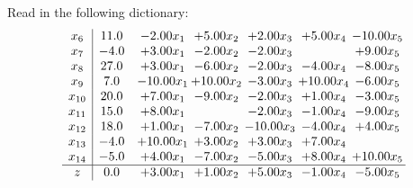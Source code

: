 \documentclass[9pt]{article}
\begin{document}
Read in the following dictionary:
\[\begin{array}{c| c c@{\hskip 2pt} c@{\hskip 2pt} c@{\hskip 2pt} c@{\hskip 2pt} c@{\hskip 2pt} }
 x_{6}   &  11.0 & -2.00 x_{1} & +  5.00 x_{2} & +  2.00 x_{3} & +  5.00 x_{4} & -10.00 x_{5}\\
 x_{7}   &  -4.0 & +  3.00 x_{1} & -2.00 x_{2} & -2.00 x_{3} &   & +  9.00 x_{5}\\
 x_{8}   &  27.0 & +  3.00 x_{1} & -6.00 x_{2} & -2.00 x_{3} & -4.00 x_{4} & -8.00 x_{5}\\
 x_{9}   &  7.0 & -10.00 x_{1} & + 10.00 x_{2} & -3.00 x_{3} & + 10.00 x_{4} & -6.00 x_{5}\\
 x_{10}   &  20.0 & +  7.00 x_{1} & -9.00 x_{2} & -2.00 x_{3} & +  1.00 x_{4} & -3.00 x_{5}\\
 x_{11}   &  15.0 & +  8.00 x_{1} &   & -2.00 x_{3} & -1.00 x_{4} & -9.00 x_{5}\\
 x_{12}   &  18.0 & +  1.00 x_{1} & -7.00 x_{2} & -10.00 x_{3} & -4.00 x_{4} & +  4.00 x_{5}\\
 x_{13}   &  -4.0 & + 10.00 x_{1} & +  3.00 x_{2} & +  3.00 x_{3} & +  7.00 x_{4} &   \\
 x_{14}   &  -5.0 & +  4.00 x_{1} & -7.00 x_{2} & -5.00 x_{3} & +  8.00 x_{4} & + 10.00 x_{5}\\
\hline
z    &  0.0 & +  3.00 x_{1} & +  1.00 x_{2} & +  5.00 x_{3} & -1.00 x_{4} & -5.00 x_{5}\\
\end{array}\]
\end{document}
